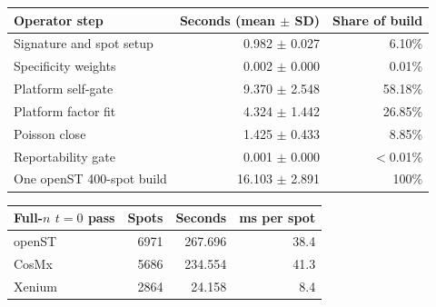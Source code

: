 \begin{tabular}{lrr}
\toprule
Operator step & Seconds (mean \(\pm\) SD) & Share of build \\
\midrule
Signature and spot setup & 0.982 \(\pm\) 0.027 & 6.10\% \\
Specificity weights & 0.002 \(\pm\) 0.000 & 0.01\% \\
Platform self-gate & 9.370 \(\pm\) 2.548 & 58.18\% \\
Platform factor fit & 4.324 \(\pm\) 1.442 & 26.85\% \\
Poisson close & 1.425 \(\pm\) 0.433 & 8.85\% \\
Reportability gate & 0.001 \(\pm\) 0.000 & \(<\)0.01\% \\
\midrule
One openST 400-spot build & 16.103 \(\pm\) 2.891 & 100\% \\
\bottomrule
\end{tabular}

\vspace{4pt}

\begin{tabular}{lrrr}
\toprule
Full-\(n\) \(t=0\) pass & Spots & Seconds & ms per spot \\
\midrule
openST & 6971 & 267.696 & 38.4 \\
CosMx & 5686 & 234.554 & 41.3 \\
Xenium & 2864 & 24.158 & 8.4 \\
\bottomrule
\end{tabular}
